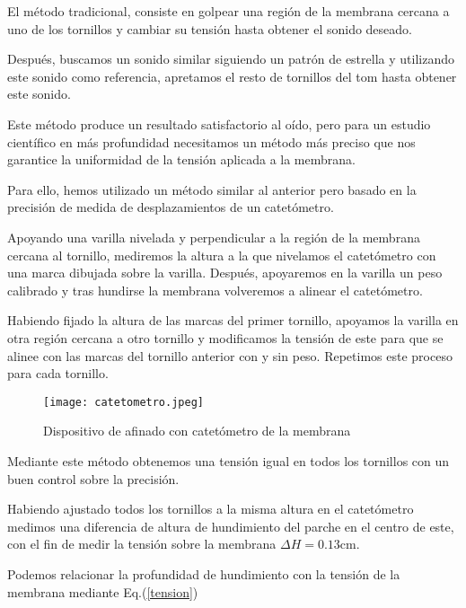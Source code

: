 \documentclass[journal, a4paper,onecolumn]{IEEEtran}
\newcommand{\equationref}[1]{Eq.(\ref{#1})}
\begin{document}
 El método tradicional, consiste en golpear una región de la membrana cercana a uno de los tornillos y cambiar su tensión hasta obtener el sonido deseado. \newline
 
 Después, buscamos un sonido similar siguiendo un patrón de estrella y utilizando este sonido como referencia, apretamos el resto de tornillos del tom hasta obtener este sonido. \newline
 
 Este método produce un resultado satisfactorio al oído, pero para un estudio científico en más profundidad necesitamos un método más preciso que nos garantice la uniformidad de la tensión aplicada a la membrana. \newline
 
 Para ello, hemos utilizado un método similar al anterior pero basado en la precisión de medida de desplazamientos de un catetómetro.\newline
 
 Apoyando una varilla nivelada y perpendicular a la región de la membrana cercana al tornillo, mediremos la altura a la que nivelamos el catetómetro con una marca dibujada sobre la varilla. Después, apoyaremos en la varilla un peso calibrado y tras hundirse la membrana volveremos a alinear el catetómetro.\newline
 
 Habiendo fijado la altura de las marcas del primer tornillo, apoyamos la varilla en otra región cercana a otro tornillo y modificamos la tensión de este para que se alinee con las marcas del tornillo anterior con y sin peso. Repetimos este proceso para cada tornillo. \newline
 
 \begin{figure}[H]
     \centering
     \texttt{[image: catetometro.jpeg]}
     \caption{Dispositivo de afinado con catetómetro de la membrana}
     \label{catetómetro}
 \end{figure}
 
Mediante este método obtenemos una tensión igual en todos los tornillos con un buen control sobre la precisión.

Habiendo ajustado todos los tornillos a la misma altura en el catetómetro medimos una diferencia de altura de hundimiento del parche en el centro de este, con el fin de medir la tensión sobre la membrana $\Delta H = 0.13$cm. \newline

Podemos relacionar la profundidad de hundimiento con la tensión de la membrana mediante \equationref{tension}\newline
\end{document}
